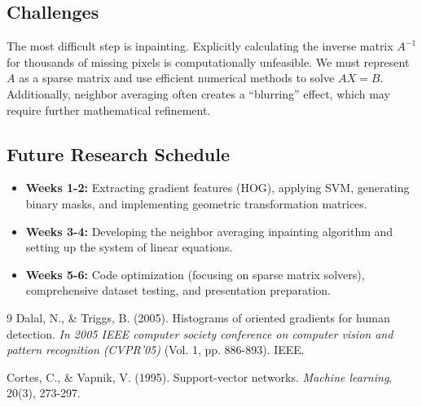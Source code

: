 \documentclass[12pt]{article}
\begin{document}
\subsection*{Challenges}
The most difficult step is inpainting. Explicitly calculating the inverse matrix $A^{-1}$ for thousands of missing pixels is computationally unfeasible. We must represent $A$ as a sparse matrix and use efficient numerical methods to solve $AX = B$. Additionally, neighbor averaging often creates a ``blurring'' effect, which may require further mathematical refinement.

\subsection*{Future Research Schedule}
\begin{itemize}
    \item \textbf{Weeks 1-2:} Extracting gradient features (HOG), applying SVM, generating binary masks, and implementing geometric transformation matrices.
    \item \textbf{Weeks 3-4:} Developing the neighbor averaging inpainting algorithm and setting up the system of linear equations.
    \item \textbf{Weeks 5-6:} Code optimization (focusing on sparse matrix solvers), comprehensive dataset testing, and presentation preparation.
\end{itemize}

\begin{thebibliography}{9}
Dalal, N., \& Triggs, B. (2005). Histograms of oriented gradients for human detection. \textit{In 2005 IEEE computer society conference on computer vision and pattern recognition (CVPR'05)} (Vol. 1, pp. 886-893). IEEE.

Cortes, C., \& Vapnik, V. (1995). Support-vector networks. \textit{Machine learning}, 20(3), 273-297.
\end{thebibliography}
\end{document}

